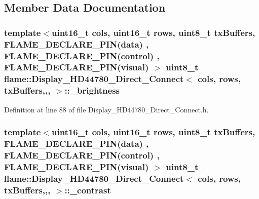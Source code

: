\subsection{Member Data Documentation}
\hypertarget{classflame_1_1_display___h_d44780___direct___connect_aa0454a004930d249cd3c13a54d5dc953}{
\subsubsection[{\-\_\-brightness}]{\setlength{\rightskip}{0pt plus 5cm}template$<$uint16\-\_\-t cols, uint16\-\_\-t rows, uint8\-\_\-t tx\-Buffers, F\-L\-A\-M\-E\-\_\-\-D\-E\-C\-L\-A\-R\-E\-\_\-\-P\-I\-N(data) , F\-L\-A\-M\-E\-\_\-\-D\-E\-C\-L\-A\-R\-E\-\_\-\-P\-I\-N(control) , F\-L\-A\-M\-E\-\_\-\-D\-E\-C\-L\-A\-R\-E\-\_\-\-P\-I\-N(visual) $>$ uint8\-\_\-t {\bf flame\-::\-Display\-\_\-\-H\-D44780\-\_\-\-Direct\-\_\-\-Connect}$<$ cols, rows, tx\-Buffers,,, $>$\-::\-\_\-brightness\hspace{0.3cm}{\ttfamily [protected]}}}\label{classflame_1_1_display___h_d44780___direct___connect_aa0454a004930d249cd3c13a54d5dc953}


Definition at line 88 of file Display\-\_\-\-H\-D44780\-\_\-\-Direct\-\_\-\-Connect.\-h.

\hypertarget{classflame_1_1_display___h_d44780___direct___connect_a889e562f76f0f7d3299e55909f881f50}{
\subsubsection[{\-\_\-contrast}]{\setlength{\rightskip}{0pt plus 5cm}template$<$uint16\-\_\-t cols, uint16\-\_\-t rows, uint8\-\_\-t tx\-Buffers, F\-L\-A\-M\-E\-\_\-\-D\-E\-C\-L\-A\-R\-E\-\_\-\-P\-I\-N(data) , F\-L\-A\-M\-E\-\_\-\-D\-E\-C\-L\-A\-R\-E\-\_\-\-P\-I\-N(control) , F\-L\-A\-M\-E\-\_\-\-D\-E\-C\-L\-A\-R\-E\-\_\-\-P\-I\-N(visual) $>$ uint8\-\_\-t {\bf flame\-::\-Display\-\_\-\-H\-D44780\-\_\-\-Direct\-\_\-\-Connect}$<$ cols, rows, tx\-Buffers,,, $>$\-::\-\_\-contrast\hspace{0.3cm}{\ttfamily [protected]}}}\label{classflame_1_1_display___h_d44780___direct___connect_a889e562f76f0f7d3299e55909f881f50}


